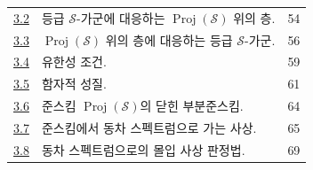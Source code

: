 \begin{longtable}{@{}p{}p{}r@{}}
\hyperref[subsection:II.3.2-ko]{3.2} & 등급 $\mathcal{S}$-가군에 대응하는 $\operatorname{Proj}(\mathcal{S})$ 위의 층. & 54\\
\hyperref[subsection:II.3.3-ko]{3.3} & $\operatorname{Proj}(\mathcal{S})$ 위의 층에 대응하는 등급 $\mathcal{S}$-가군. & 56\\
\hyperref[subsection:II.3.4-ko]{3.4} & 유한성 조건. & 59\\
\hyperref[subsection:II.3.5-ko]{3.5} & 함자적 성질. & 61\\
\hyperref[subsection:II.3.6-ko]{3.6} & 준스킴 $\operatorname{Proj}(\mathcal{S})$의 닫힌 부분준스킴. & 64\\
\hyperref[subsection:II.3.7-ko]{3.7} & 준스킴에서 동차 스펙트럼으로 가는 사상. & 65\\
\hyperref[subsection:II.3.8-ko]{3.8} & 동차 스펙트럼으로의 몰입 사상 판정법. & 69\\
\end{longtable}
